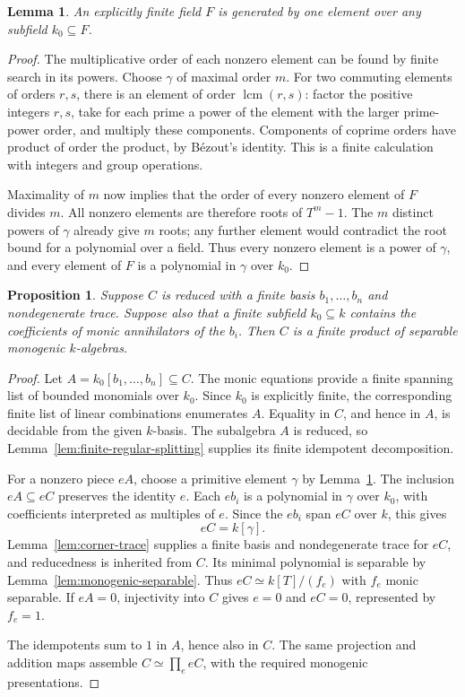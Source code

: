 \documentclass[11pt]{article}
\newtheorem{proposition}[theorem]{Proposition}
\newtheorem{lemma}[theorem]{Lemma}
\theoremstyle{definition}
\theoremstyle{remark}
\begin{document}
\begin{lemma}\label{lem:finite-field-primitive}
An explicitly finite field $F$ is generated by one element over any
subfield $k_0\subseteq F$.
\end{lemma}
\begin{proof}
The multiplicative order of each nonzero element can be found by
finite search in its powers. Choose $\gamma$ of maximal order $m$.
For two commuting elements of orders $r,s$, there is an element of
order $\operatorname{lcm}(r,s)$: factor the positive integers $r,s$,
take for each prime a power of the element with the larger prime-power
order, and multiply these components. Components of coprime orders
have product of order the product, by B\'ezout's identity.
This is a finite calculation with integers and group operations.

Maximality of $m$ now implies that the order of every nonzero element
of $F$ divides $m$. All nonzero elements are therefore roots of
$T^m-1$. The $m$ distinct powers of $\gamma$ already give $m$ roots;
any further element would contradict the root bound for a polynomial
over a field. Thus every nonzero element is a power of $\gamma$,
and every element of $F$ is a polynomial in $\gamma$ over $k_0$.
\end{proof}

\begin{proposition}\label{prop:small}
Suppose $C$ is reduced with a finite basis $b_1,\ldots,b_n$ and
nondegenerate trace. Suppose also that a finite subfield $k_0\subseteq k$
contains the coefficients of monic annihilators of the $b_i$.
Then $C$ is a finite product of separable monogenic $k$-algebras.
\end{proposition}
\begin{proof}
Let $A=k_0[b_1,\ldots,b_n]\subseteq C$. The monic equations provide
a finite spanning list of bounded monomials over $k_0$.
Since $k_0$ is explicitly finite, the corresponding finite list of
linear combinations enumerates $A$. Equality in $C$, and hence in
$A$, is decidable from the given $k$-basis. The subalgebra $A$ is
reduced, so Lemma~\ref{lem:finite-regular-splitting} supplies its
finite idempotent decomposition.

For a nonzero piece $eA$, choose a primitive element $\gamma$ by
Lemma~\ref{lem:finite-field-primitive}. The inclusion $eA\subseteq eC$
preserves the identity $e$. Each $eb_i$ is a polynomial in $\gamma$
over $k_0$, with coefficients interpreted as multiples of $e$.
Since the $eb_i$ span $eC$ over $k$, this gives
\[
 eC=k[\gamma].
\]
Lemma~\ref{lem:corner-trace} supplies a finite basis and nondegenerate
trace for $eC$, and reducedness is inherited from $C$.
Its minimal polynomial is separable by
Lemma~\ref{lem:monogenic-separable}. Thus $eC\simeq k[T]/(f_e)$
with $f_e$ monic separable. If $eA=0$, injectivity into $C$ gives
$e=0$ and $eC=0$, represented by $f_e=1$.

The idempotents sum to $1$ in $A$, hence also in $C$. The same
projection and addition maps assemble
$C\simeq\prod_e eC$, with the required monogenic presentations.
\end{proof}
\end{document}
